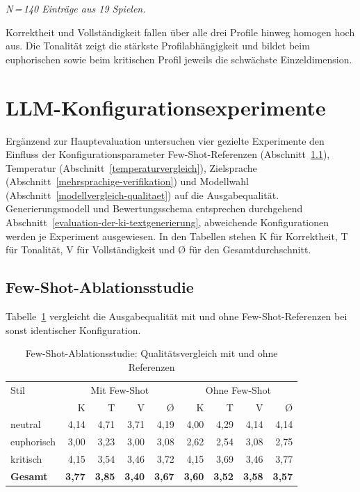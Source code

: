 \emph{N\,=\,140 Einträge aus 19 Spielen.}

Korrektheit und Vollständigkeit fallen über alle drei Profile hinweg homogen hoch aus. Die Tonalität zeigt die stärkste Profilabhängigkeit und bildet beim euphorischen sowie beim kritischen Profil jeweils die schwächste Einzeldimension.


\section{LLM-Konfigurationsexperimente}\label{llm-konfigurationsexperimente}

Ergänzend zur Hauptevaluation untersuchen vier gezielte Experimente den Einfluss der Konfigurationsparameter Few-Shot-Referenzen (Abschnitt~\ref{few-shot-ablation}), Temperatur (Abschnitt~\ref{temperaturvergleich}), Zielsprache (Abschnitt~\ref{mehrsprachige-verifikation}) und Modellwahl (Abschnitt~\ref{modellvergleich-qualitaet}) auf die Ausgabequalität. Generierungsmodell und Bewertungsschema entsprechen durchgehend Abschnitt~\ref{evaluation-der-ki-textgenerierung}, abweichende Konfigurationen werden je Experiment ausgewiesen. In den Tabellen stehen K für Korrektheit, T für Tonalität, V für Vollständigkeit und Ø für den Gesamtdurchschnitt.

\subsection{Few-Shot-Ablationsstudie}\label{few-shot-ablation}

Tabelle~\ref{tab:fewshot-ablation} vergleicht die Ausgabequalität mit und ohne Few-Shot-Referenzen bei sonst identischer Konfiguration.

\begin{longtable}[]{@{}lrrrrrrrr@{}}
\caption{Few-Shot-Ablationsstudie: Qualitätsvergleich mit und ohne Referenzen}\label{tab:fewshot-ablation}\\
\toprule\noalign{}
Stil & \multicolumn{4}{c}{Mit Few-Shot} & \multicolumn{4}{c}{Ohne Few-Shot} \\
     & K & T & V & Ø & K & T & V & Ø \\
\midrule\noalign{}
\endhead
\bottomrule\noalign{}
\endlastfoot
neutral    & 4{,}14 & 4{,}71 & 3{,}71 & 4{,}19 & 4{,}00 & 4{,}29 & 4{,}14 & 4{,}14 \\
euphorisch & 3{,}00 & 3{,}23 & 3{,}00 & 3{,}08 & 2{,}62 & 2{,}54 & 3{,}08 & 2{,}75 \\
kritisch   & 4{,}15 & 3{,}54 & 3{,}46 & 3{,}72 & 4{,}15 & 3{,}69 & 3{,}46 & 3{,}77 \\
\textbf{Gesamt} & \textbf{3{,}77} & \textbf{3{,}85} & \textbf{3{,}40} & \textbf{3{,}67} & \textbf{3{,}60} & \textbf{3{,}52} & \textbf{3{,}58} & \textbf{3{,}57} \\
\end{longtable}

